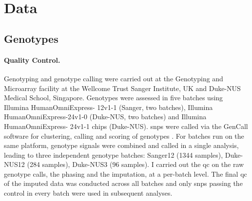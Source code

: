 \section{Data}
\subsection{Genotypes}
\label{subsection:genotypes}
\paragraph{Quality Control.} Genotyping and genotype calling were carried out at the Genotyping and Microarray facility at the Wellcome Trust Sanger Institute, UK and Duke-NUS Medical School, Singapore. Genotypes were assessed in five batches using Illumina HumanOmniExpress- 12v1-1 (Sanger, two batches), Illumina HumanOmniEx\-press-24v1-0 (Duke-NUS, two batches) and Illumina HumanOmniExpress- 24v1-1 chips (Duke-NUS). \glspl{snp} were called via the GenCall software for clustering, calling and scoring of genotypes \citep{Teo2007}. For batches run on the same platform, genotype signals were combined and called in a single analysis, leading to three independent genotype batches: Sanger12 (\num{1344} samples), Duke-NUS12 (\num{284} samples), Duke-NUS3 (\num{96} samples). I carried out the \gls{qc} on the raw genotype calls, the phasing and the imputation, at a per-batch level. The final \gls{qc} of the imputed data was conducted across all batches and only \glspl{snp} passing the control in every batch were used in subsequent analyses. 

